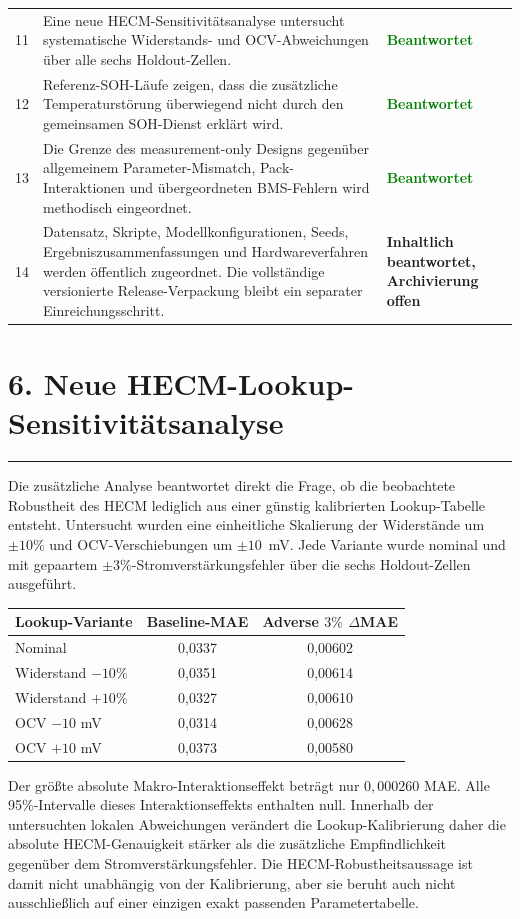 \documentclass[10pt,a4paper]{article}
\newcommand{\statusdone}{\textcolor{green}{\textbf{Beantwortet}}}
\newcommand{\statusrelease}{\textcolor{midgray}{\textbf{Inhaltlich beantwortet, Archivierung offen}}}
\newcommand{\sectionrule}{\vspace{-2pt}\color{tured}\rule{\textwidth}{0.7pt}\color{black}\vspace{2pt}}
\begin{document}
\begin{longtable}{P{0.8cm}P{10.5cm}P{3.4cm}}
11 & Eine neue HECM-Sensitivitätsanalyse untersucht systematische Widerstands- und OCV-Abweichungen über alle sechs Holdout-Zellen. & \statusdone \\
12 & Referenz-SOH-Läufe zeigen, dass die zusätzliche Temperaturstörung überwiegend nicht durch den gemeinsamen SOH-Dienst erklärt wird. & \statusdone \\
13 & Die Grenze des measurement-only Designs gegenüber allgemeinem Parameter-Mismatch, Pack-Interaktionen und übergeordneten BMS-Fehlern wird methodisch eingeordnet. & \statusdone \\
14 & Datensatz, Skripte, Modellkonfigurationen, Seeds, Ergebniszusammenfassungen und Hardwareverfahren werden öffentlich zugeordnet. Die vollständige versionierte Release-Verpackung bleibt ein separater Einreichungsschritt. & \statusrelease \\
\bottomrule
\end{longtable}

\normalsize
\section*{6. Neue HECM-Lookup-Sensitivitätsanalyse}
\sectionrule

Die zusätzliche Analyse beantwortet direkt die Frage, ob die beobachtete Robustheit des HECM lediglich aus einer günstig kalibrierten Lookup-Tabelle entsteht. Untersucht wurden eine einheitliche Skalierung der Widerstände um $\pm10\%$ und OCV-Verschiebungen um $\pm10$~mV. Jede Variante wurde nominal und mit gepaartem $\pm3\%$-Stromverstärkungsfehler über die sechs Holdout-Zellen ausgeführt.

\begin{table}[h]
\small
\centering
\begin{tabular}{lcc}
\toprule
\textbf{Lookup-Variante} & \textbf{Baseline-MAE} & \textbf{Adverse $3\%$ $\Delta$MAE} \\
\midrule
Nominal & 0,0337 & 0,00602 \\
Widerstand $-10\%$ & 0,0351 & 0,00614 \\
Widerstand $+10\%$ & 0,0327 & 0,00610 \\
OCV $-10$ mV & 0,0314 & 0,00628 \\
OCV $+10$ mV & 0,0373 & 0,00580 \\
\bottomrule
\end{tabular}
\end{table}

Der größte absolute Makro-Interaktionseffekt beträgt nur $0{,}000260$ MAE. Alle 95\%-Intervalle dieses Interaktionseffekts enthalten null. Innerhalb der untersuchten lokalen Abweichungen verändert die Lookup-Kalibrierung daher die absolute HECM-Genauigkeit stärker als die zusätzliche Empfindlichkeit gegenüber dem Stromverstärkungsfehler. Die HECM-Robustheitsaussage ist damit nicht unabhängig von der Kalibrierung, aber sie beruht auch nicht ausschließlich auf einer einzigen exakt passenden Parametertabelle.
\end{document}
